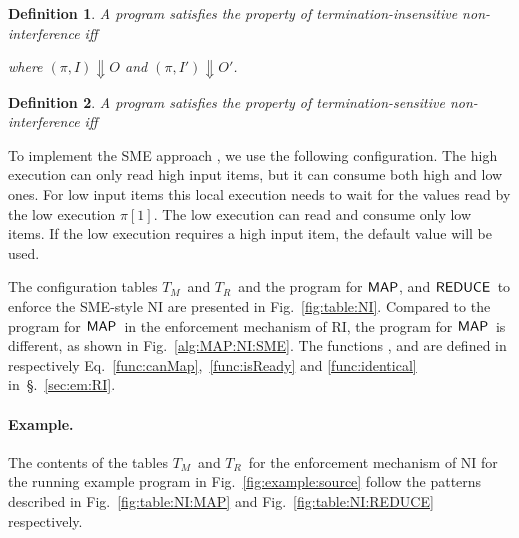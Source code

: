 \documentclass[10pt,a4paper,oneside]{article}
\newtheorem{definition}{Definition}[section]
\def\execution#1#2#3{\ensuremath{(#1, #2)\Downarrow#3}}
\def\TAV{\ensuremath{T_{M}}}
\def\TPV{\ensuremath{T_{R}}}
\def\sanserif#1{\ensuremath{\sf #1}}
\def\REDUCE{\ensuremath{\sanserif{REDUCE}}}
\def\MAP{\ensuremath{\sanserif{MAP}}}
\def\Prog{\ensuremath{\pi}}
\def\Progl#1{\ensuremath{\Prog[#1]}}
\begin{document}
\begin{definition}\label{def:NI}
A program  satisfies the property of \emph{termination-insensitive non-interference} iff

where \execution{\Prog}{I}{O} and \execution{\Prog}{I'}{O'}.
\end{definition}


\begin{definition}\label{def:TSNI}
A program  satisfies the property of \emph{termination-sensitive non-interference} iff

\end{definition}


To implement the SME approach \cite{Devr-Pies-10-IEEESP}, we use the following configuration. The high execution  can only read high input items, but it can consume both high and low ones. For low input items this local execution needs to wait for the values read by the low execution \Progl{1}. The low execution  can read and consume only low items. If the low execution requires a high input item, the default value will be used.



The configuration tables \TAV\ and \TPV\ and the program for \MAP, and \REDUCE\ to enforce the SME-style NI are presented in Fig.~\ref{fig:table:NI}. Compared to the program for \MAP\ in the enforcement mechanism of RI, the program for \MAP\ is different, as shown in Fig.~\ref{alg:MAP:NI:SME}. The functions ,  and  are defined in respectively Eq.~\ref{func:canMap},~\ref{func:isReady} and \ref{func:identical} in~\S.~\ref{sec:em:RI}.

\paragraph{Example.}
The contents of the tables \TAV\ and \TPV\ for the enforcement mechanism of NI for the running example program in Fig.~\ref{fig:example:source} follow the patterns described in Fig.~\ref{fig:table:NI:MAP} and Fig.~\ref{fig:table:NI:REDUCE} respectively. 
\end{document}
